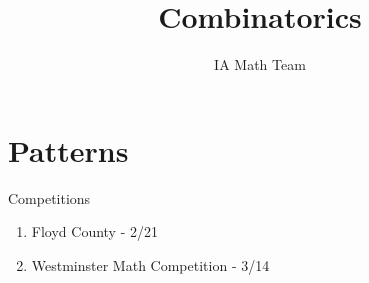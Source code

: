 \documentclass[aspectratio=169,xcolor=dvipsnames]{beamer}
\title[Combinatorics]{Combinatorics}
\author[IA Math Team]{IA Math Team}
\begin{document}
\begin{frame}[t]
  \titlepage
\end{frame}

\section{Patterns}

\begin{frame}[t]{Competitions}
    
    \vspace{1cm}
    \begin{enumerate}
        \item Floyd County - 2/21
        \item Westminster Math Competition - 3/14
    \end{enumerate}
\end{frame}
\end{document}
